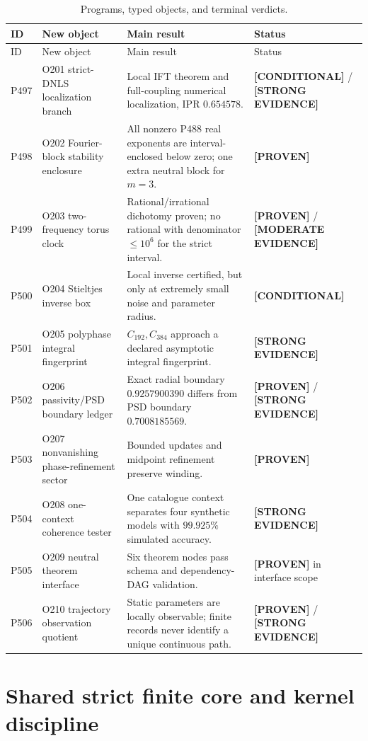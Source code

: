 \documentclass[11pt,a4paper]{article}
\theoremstyle{definition}
\theoremstyle{remark}
\newcommand{\status}[2]{\textcolor{#1}{\textbf{[#2]}}}
\newcommand{\proven}{\status{fingreen}{PROVEN}}
\newcommand{\strong}{\status{finblue}{STRONG EVIDENCE}}
\newcommand{\moderate}{\status{finorange}{MODERATE EVIDENCE}}
\newcommand{\conditional}{\status{fingray}{CONDITIONAL}}
\begin{document}
\begin{longtable}{@{}p{}p{}p{}p{}@{}}
\caption{Programs, typed objects, and terminal verdicts.}\\
\toprule
ID & New object & Main result & Status\\
\midrule
\endfirsthead
\toprule
ID & New object & Main result & Status\\
\midrule
\endhead
P497 & O201 strict-DNLS localization branch & Local IFT theorem and full-coupling numerical localization, IPR $0.654578$. & \conditional{} / \strong\\
P498 & O202 Fourier-block stability enclosure & All nonzero P488 real exponents are interval-enclosed below zero; one extra neutral block for $m=3$. & \proven\\
P499 & O203 two-frequency torus clock & Rational/irrational dichotomy proven; no rational with denominator $\le10^6$ for the strict interval. & \proven{} / \moderate\\
P500 & O204 Stieltjes inverse box & Local inverse certified, but only at extremely small noise and parameter radius. & \conditional{}\\
P501 & O205 polyphase integral fingerprint & $C_{192},C_{384}$ approach a declared asymptotic integral fingerprint. & \strong\\
P502 & O206 passivity/PSD boundary ledger & Exact radial boundary $0.9257900390$ differs from PSD boundary $0.7008185569$. & \proven{} / \strong\\
P503 & O207 nonvanishing phase-refinement sector & Bounded updates and midpoint refinement preserve winding. & \proven\\
P504 & O208 one-context coherence tester & One catalogue context separates four synthetic models with $99.925\%$ simulated accuracy. & \strong\\
P505 & O209 neutral theorem interface & Six theorem nodes pass schema and dependency-DAG validation. & \proven{} in interface scope\\
P506 & O210 trajectory observation quotient & Static parameters are locally observable; finite records never identify a unique continuous path. & \proven{} / \strong\\
\bottomrule
\end{longtable}

\section{Shared strict finite core and kernel discipline}
\end{document}
